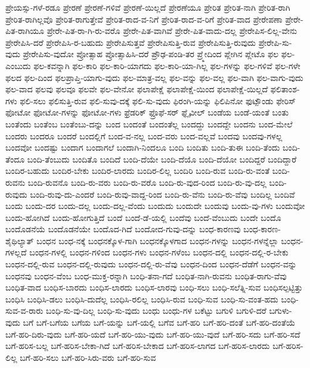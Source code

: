 {ಪ್ರೇಯಸ್ಸು-ಗಳೆ-ರಡೂ
ಪ್ರೇರಣೆ
ಪ್ರೇರಣೆ-ಗಳಿವೆ
ಪ್ರೇರಣೆ-ಯಿಲ್ಲದೆ
ಪ್ರೇರಣೆಯೂ
ಪ್ರೇರಿತ
ಪ್ರೇರಿತ-ನಾಗಿ
ಪ್ರೇರಿತ-ರಾಗಿ
ಪ್ರೇರಿತ-ರಾಗಿಲ್ಲವೊ
ಪ್ರೇರಿತ-ರಾಗುತ್ತೇವೆ
ಪ್ರೇರಿತ-ರಾದ-ವ-ನಿಗೆ
ಪ್ರೇರಿತ-ರಾದ-ವ-ರಿಗೆ
ಪ್ರೇರಿತ-ವಾದ
ಪ್ರೇರೇಪಣಾ
ಪ್ರೇರೇ-ಪಿತ-ರಾಗಿಯೂ
ಪ್ರೇರೇ-ಪಿತ-ರಾ-ಗಿ-ರು-ವರೊ
ಪ್ರೇರೇ-ಪಿತ-ವಾಗಿವೆ
ಪ್ರೇರೇ-ಪಿತ-ವಾದು-ದಲ್ಲ
ಪ್ರೇರೇಪಿಸ-ಲಿಲ್ಲ-ವೇನು
ಪ್ರೇರೇಪಿಸಿ-ದರೆ
ಪ್ರೇರೇಪಿಸಿ-ರ-ಬಹುದು
ಪ್ರೇರೇಪಿಸುತ್ತವೆ
ಪ್ರೇರೇಪಿಸುತ್ತಿ-ರುವ
ಪ್ರೇರೇಪಿಸುತ್ತಿ-ರುವುದು
ಪ್ರೇರೇಪಿ-ಸು-ವುದು
ಪ್ರೇರೇಪಿಸು-ವುದೋ
ಪ್ರೋತ್ಸಾಹ
ಪ್ರೋತ್ಸಾಹಿಸಿ-ದರೆ
ಪ್ರೌಢ-ಪಂಡಿ-ತರ
ಪ್ರ್ಮೇದಿಂದ
ಪ್ಲೇಗಿನ
ಪ್ಲೇಟೊ
ಫಲ
ಫಲ-ಎಂಬುದು
ಫಲ-ಕವನ್ನಾಗಿ
ಫಲ-ಕಾರಿ
ಫಲ-ಕಾರಿ-ಯಾಗದು
ಫಲ-ಕಾರಿ-ಯಾ-ಗಿಲ್ಲ
ಫಲ-ಗಳನ್ನು
ಫಲ-ಗಳಿವೆ
ಫಲ-ಗಳೇ
ಫಲದ
ಫಲ-ದಿಂದ
ಫಲಪ್ರಾಪ್ತಿ-ಯಾಗು-ವುದು
ಫಲ-ಮಾತ್ರ-ವಲ್ಲ
ಫಲ-ವನ್ನು
ಫಲ-ವಲ್ಲ
ಫಲ-ವಾಗಿ
ಫಲ-ವಾಗು-ವುದು
ಫಲ-ವಾದ
ಫಲವು
ಫಲವೂ
ಫಲವೇ
ಫಲ-ವೇನೋ
ಫಲಾಪೇಕ್ಷೆ
ಫಲಾಪೇಕ್ಷೆ-ಯಿಂದ
ಫಲಾಪೇಕ್ಷೆ-ಯಿಲ್ಲದೆ
ಫಲಿತಾಂಶ-ಗಳು
ಫಲಿ-ಸಲು
ಫಲಿಸುತ್ತಿ-ರುವ
ಫಲಿ-ಸುವು-ದಕ್ಕೆ
ಫಲಿ-ಸು-ವುದು
ಫಿರಂಗಿ-ಯನ್ನು
ಫಿಲಿಪಿನೋ
ಫುಟ್ಪೌಂಡು
ಫೇರಿಸ್
ಫೋಟೋ
ಫೋಟೋ-ಗಳನ್ನು
ಫೋಟೋ-ಗಳು
ಫ್ರೆಡರಿಕ್
ಫ್ರೊಫೆ-ಸರ್
ಫ್ಲೈವೀಲ್
ಬಂಡೆಯ
ಬಂಡೆ-ಯಂತೆ
ಬಂತು
ಬಂತೆಂದು
ಬಂತೆಂಬ
ಬಂತೆಂಬು-ದನ್ನು
ಬಂದ
ಬಂದಂತೆ
ಬಂದಂತೆಲ್ಲ
ಬಂದದ್ದು
ಬಂದದ್ದೇ
ಬಂದನು
ಬಂದ-ಮೇಲೆ
ಬಂದರು
ಬಂದರೂ
ಬಂದರೆ
ಬಂದಲ್ಲಿಗೆ
ಬಂದ-ವ-ನಲ್ಲ
ಬಂದ-ವರು
ಬಂದ-ವಲ್ಲವೆ
ಬಂದವು
ಬಂದವು-ಗಳಲ್ಲ
ಬಂದವೋ
ಬಂದಷ್ಟು
ಬಂದಾಗ
ಬಂದಾಗಲೆ
ಬಂದಾಗಿ-ನಿಂದಲೂ
ಬಂದಿ
ಬಂದಿತು
ಬಂದಿ-ತುಈ
ಬಂದಿ-ತೆಂದು
ಬಂದಿ-ತೆಂದೂ
ಬಂದಿ-ತೆಂಬುದು
ಬಂದಿತೊ
ಬಂದಿದೆ
ಬಂದಿ-ದೆಯೇ
ಬಂದಿ-ದೆಯೊ
ಬಂದಿ-ದೆಯೋ
ಬಂದಿದ್ದರೆ
ಬಂದಿದ್ದಾರೆ
ಬಂದಿರ-ಬಹುದು
ಬಂದಿರ-ಬೇಕು
ಬಂದಿರ-ಲಾರದು
ಬಂದಿರ-ಲಿಲ್ಲ
ಬಂದಿರಿ
ಬಂದಿ-ರುವ
ಬಂದಿ-ರು-ವಂತೆ
ಬಂದಿ-ರುವನು
ಬಂದಿ-ರುವನೊ
ಬಂದಿ-ರು-ವರು
ಬಂದಿ-ರು-ವರೊ
ಬಂದಿ-ರು-ವುದ-ರಿಂದ
ಬಂದಿ-ರು-ವು-ದಲ್ಲ
ಬಂದಿ-ರುವುದು
ಬಂದಿ-ರುವು-ದು-ಎಂದರೆ
ಬಂದಿ-ರುವು-ವಾದ್ದ-ರಿಂದ
ಬಂದಿ-ರು-ವೆನು
ಬಂದಿ-ರು-ವೆವು
ಬಂದಿಲ್ಲ
ಬಂದಿವೆ
ಬಂದು
ಬಂದು-ದರ
ಬಂದು-ದಲ್ಲ
ಬಂದು-ದಲ್ಲ-ವೆಂದು
ಬಂದುದು
ಬಂದುದೇ
ಬಂದುವು
ಬಂದು-ವು-ಗಳು
ಬಂದುವೋ
ಬಂದು-ಹೋಗಿದೆ
ಬಂದು-ಹೋಗುತ್ತಿದೆ
ಬಂದೆ
ಬಂದೆ-ಡೆ-ಯಲ್ಲಿ
ಬಂದೆವು
ಬಂದೆ-ವೆಂಬುದು
ಬಂದೇ
ಬಂದೊ
ಬಂದೊಡನೆಯೆ
ಬಂದೊಡನೆಯೇ
ಬಂದೊದ-ಗಿದೆ
ಬಂದೋದ-ಗುವು-ದನ್ನು
ಬಂಧ-ಕಾರಣವು
ಬಂಧ-ಕಾರಣ-ಶೈಥಿಲ್ಯಾತ್
ಬಂಧನ
ಬಂಧ-ನಕ್ಕೆ
ಬಂಧನಕ್ಕೊಳ-ಗಾಗಿ
ಬಂಧನಕ್ಕೊಳಗಾದ
ಬಂಧನ-ಗಳನ್ನು
ಬಂಧನ-ಗಳನ್ನೆಲ್ಲಾ
ಬಂಧನ-ಗಳಲ್ಲದೆ
ಬಂಧನ-ಗಳಲ್ಲಿ
ಬಂಧನ-ಗಳಿಂದ
ಬಂಧನ-ಗಳು
ಬಂಧನ-ಗಳೆಂಬ
ಬಂಧನ-ದಲ್ಲಿ
ಬಂಧನ-ದಲ್ಲಿ-ರ-ಬೇಕು
ಬಂಧನ-ದಲ್ಲಿ-ರುವ
ಬಂಧನ-ದಲ್ಲಿ-ರುವುದು
ಬಂಧನ-ದಲ್ಲಿ-ರು-ವೆವು
ಬಂಧನ-ದಿಂದ
ಬಂಧನ-ದೆಡೆಗೆ
ಬಂಧನ-ವನ್ನು
ಬಂಧನವು
ಬಂಧನ-ವೆಂಬ
ಬಂಧ-ಮುಕ್ತ-ರನ್ನಾಗಿ
ಬಂಧಿ-ತನಾ-ಗದೆ
ಬಂಧಿತ-ನಾಗಿ-ರುವನು
ಬಂಧಿತ-ರಾಗು-ವೆವು
ಬಂಧಿತ-ವಾದ
ಬಂಧಿಸ-ಬಾರದು
ಬಂಧಿಸ-ಲಾರದು
ಬಂಧಿಸ-ಲಾರವು
ಬಂಧಿ-ಸಲು
ಬಂಧಿ-ಸಲೆತ್ನಿ-ಸುವ
ಬಂಧಿಸಲ್ಪಟ್ಟಿತ್ತು
ಬಂಧಿಸಿ
ಬಂಧಿಸಿ-ಡಲು
ಬಂಧಿಸಿ-ದುದೆಲ್ಲ
ಬಂಧಿಸಿ-ರಲಿಲ್ಲ
ಬಂಧಿಸಿ-ರುವ
ಬಂಧಿ-ಸುವ
ಬಂಧಿ-ಸು-ವಂತ-ಹದು
ಬಂಧಿ-ಸುವ-ವ-ರಾರು
ಬಂಧಿ-ಸು-ವು-ದಿಲ್ಲ
ಬಂಧಿ-ಸು-ವುದು
ಬಂಧು
ಬಂಧು-ಗಳ
ಬಕೆಟ್ಟು
ಬಗುಳಿ
ಬಗುಳಿ-ದರೆ
ಬಗುಳು-ವುದು
ಬಗೆ
ಬಗೆ-ಬಗೆಯ
ಬಗೆಯ
ಬಗೆ-ಯನ್ನು
ಬಗೆ-ಯಲ್ಲಿ
ಬಗೆವ
ಬಗೆ-ಹರಿ
ಬಗೆ-ಹರಿ-ದಂತೆ
ಬಗೆ-ಹರಿ-ದಂತೆಯೆ
ಬಗೆ-ಹರಿ-ದಿರು-ವುದು
ಬಗೆ-ಹರಿ-ಯದೆ
ಬಗೆ-ಹರಿ-ಯು-ವುದು
ಬಗೆ-ಹರಿ-ಯು-ವುದೆ
ಬಗೆ-ಹರಿ-ಸದು
ಬಗೆ-ಹರಿ-ಸದೆ
ಬಗೆ-ಹರಿಸ-ಬಲ್ಲ
ಬಗೆ-ಹರಿಸ-ಬೇಕಾ-ಗಿದೆ
ಬಗೆ-ಹರಿಸ-ಬೇಕಾದ
ಬಗೆ-ಹರಿಸ-ಲಾಗದ
ಬಗೆ-ಹರಿಸ-ಲಾರದು
ಬಗೆ-ಹರಿಸ-ಲಿಲ್ಲ
ಬಗೆ-ಹರಿ-ಸಲು
ಬಗೆ-ಹರಿ-ಸಿರು-ವರು
ಬಗೆ-ಹರಿ-ಸುವ
}
